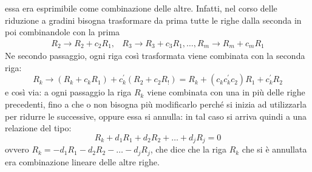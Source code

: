 \begin{defi}
  essa era esprimibile come combinazione delle altre. Infatti, nel corso
  delle riduzione a gradini bisogna trasformare da prima tutte le
  righe dalla seconda in poi combinandole con la prima
  \begin{equation*}
    \begin{matrix}
      R_2\to R_2+c_2R_1, & R_3\to R_3+c_3R_1,\dots,R_m \to R_m+c_mR_1
    \end{matrix}
  \end{equation*}
  Ne secondo passaggio, ogni riga così trasformata viene combinata con la
  seconda riga:
  \begin{equation*}
    R_k\to (R_k+c_kR_1)+c_k^\prime(R_2+c_2R_!)=R_k+(c_kc^\prime_kc_2)R_1
    +c_k^\prime R_2
  \end{equation*}
  e così via: a ogni passaggio la riga $R_k$ viene combinata con una in
  più delle righe precedenti, fino a che o non bisogna più modificarlo
  perché si inizia ad utilizzarla per ridurre le successive, oppure essa
  si annulla: in tal caso si arriva quindi a una relazione del tipo:
  \begin{equation*}
    R_k+d_1R_1+d_2R_2+\dots+d_jR_j=0
  \end{equation*}
  ovvero $R_k=-d_1R_1-d_2R_2-\dots-d_jR_j$, che dice che la riga $R_k$ che
  si è annullata era combinazione lineare delle altre righe.
\end{defi}
